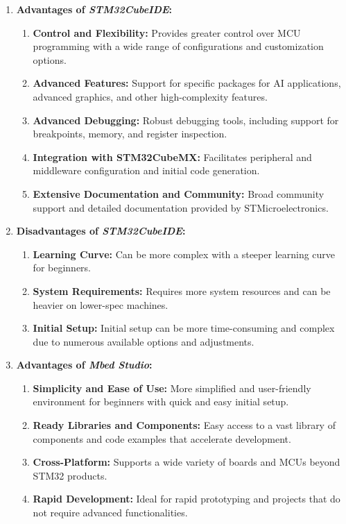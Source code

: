 \documentclass[10pt,a4paper,onecolumn]{article}
\begin{document}
\begin{enumerate}
  \item \textbf{Advantages of \textit{STM32CubeIDE}:}
    \begin{enumerate}
      \item \textbf{Control and Flexibility:} Provides greater control over MCU programming with a wide range of configurations and customization options.
      \item \textbf{Advanced Features:} Support for specific packages for AI applications, advanced graphics, and other high-complexity features.
      \item \textbf{Advanced Debugging:} Robust debugging tools, including support for breakpoints, memory, and register inspection.
      \item \textbf{Integration with STM32CubeMX:} Facilitates peripheral and middleware configuration and initial code generation.
      \item \textbf{Extensive Documentation and Community:} Broad community support and detailed documentation provided by STMicroelectronics.
    \end{enumerate}
  \item \textbf{Disadvantages of \textit{STM32CubeIDE}:}
    \begin{enumerate}
      \item \textbf{Learning Curve:} Can be more complex with a steeper learning curve for beginners.
      \item \textbf{System Requirements:} Requires more system resources and can be heavier on lower-spec machines.
      \item \textbf{Initial Setup:} Initial setup can be more time-consuming and complex due to numerous available options and adjustments.
    \end{enumerate}
  \item \textbf{Advantages of \textit{Mbed Studio}:}
    \begin{enumerate}
      \item \textbf{Simplicity and Ease of Use:} More simplified and user-friendly environment for beginners with quick and easy initial setup.
      \item \textbf{Ready Libraries and Components:} Easy access to a vast library of components and code examples that accelerate development.
      \item \textbf{Cross-Platform:} Supports a wide variety of boards and MCUs beyond STM32 products.
      \item \textbf{Rapid Development:} Ideal for rapid prototyping and projects that do not require advanced functionalities.

\end{enumerate}
\end{enumerate}
\end{document}
